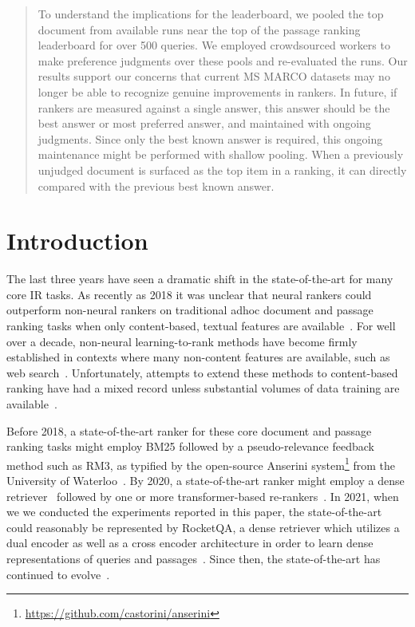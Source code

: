 \documentclass[fullpage]{article}
\begin{document}
\begin{abstract}
To understand the implications for the leaderboard, we pooled the top document from available runs near the top of the passage ranking leaderboard for over 500 queries. We employed crowdsourced workers to make preference judgments over these pools and re-evaluated the runs. Our results support our concerns that current MS MARCO datasets may no longer be able to recognize genuine improvements in rankers. In future, if rankers are measured against a single answer, this answer should be the best answer or most preferred answer, and maintained with ongoing judgments.
Since only the best known answer is required, this ongoing maintenance might be performed with shallow pooling. When a previously unjudged document is surfaced as the top item in a ranking, it can directly compared with the previous best known answer.
\end{abstract}

\newpage
\section{Introduction}

The last three years have seen a dramatic shift in the state-of-the-art for many core IR tasks. As recently as 2018 it was unclear that neural rankers could outperform non-neural rankers on traditional adhoc document and passage ranking tasks when only content-based, textual features are available~\cite{lin19}. For well over a decade, non-neural learning-to-rank methods have become firmly established in contexts where many non-content features are available, such as web search~\cite{bsr05,jr07}. Unfortunately, attempts to extend these methods to content-based ranking have had a mixed record unless substantial volumes of data training are available~\cite{sb09,yahoo}.

Before 2018,
a state-of-the-art ranker for these core document and passage ranking tasks might employ BM25 followed by a pseudo-relevance feedback method such as RM3, as typified by the open-source Anserini system\footnote{\url{https://github.com/castorini/anserini}} from the University of Waterloo~\cite{yang2018anserini}.
By 2020, a state-of-the-art ranker might employ a dense retriever~\cite{xiong2020approximate,ding2020rocketqa,hofstatter2020improving,khattab2020colbert} followed by one or more transformer-based re-rankers~\cite{nogueira2019passage,nogueira2019multi,han2020learning}.
In 2021, when we we conducted the experiments reported in this paper,
the state-of-the-art could reasonably be represented by RocketQA, a dense retriever which utilizes a dual encoder as well as a cross encoder architecture in order to learn dense representations of queries and passages~\cite{ding2020rocketqa}.
Since then, the state-of-the-art has continued to evolve~\cite{sota0,sota1,sota2}.
\end{document}
